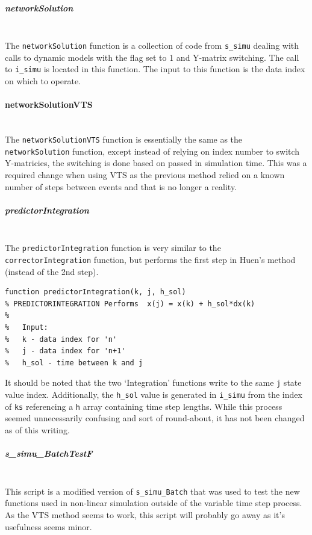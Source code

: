 \documentclass[12pt]{article}
\begin{document}
\subparagraph{networkSolution} \ \\
The \verb|networkSolution| function is a collection of code from \verb|s_simu| dealing with calls to dynamic models with the flag set to 1 and Y-matrix switching.
The call to \verb|i_simu| is located in this function.
The input to this function is the data index on which to operate.

\paragraph{networkSolutionVTS} \ \\
The \verb|networkSolutionVTS| function is essentially the same as the \verb|networkSolution| function, except instead of relying on index number to switch Y-matricies, the switching is done based on passed in simulation time.
This was a required change when using VTS as the previous method relied on a known number of steps between events and that is no longer a reality.

\subparagraph{predictorIntegration} \ \\
The \verb|predictorIntegration| function is very similar to the \verb|correctorIntegration| function, but performs the first step in Huen's method (instead of the 2nd step).
\begin{verbatim}
function predictorIntegration(k, j, h_sol)
% PREDICTORINTEGRATION Performs  x(j) = x(k) + h_sol*dx(k)
%
%   Input:
%   k - data index for 'n'
%   j - data index for 'n+1'
%   h_sol - time between k and j
\end{verbatim}

It should be noted that the two `Integration' functions write to the same \verb|j| state value index.
Additionally, the \verb|h_sol| value is generated in \verb|i_simu| from the index of \verb|ks| referencing a \verb|h| array containing time step lengths.
While this process seemed unnecessarily confusing and sort of  round-about, it has not been changed as of this writing.

\subparagraph{s\_simu\_BatchTestF} \ \\
This script is a modified version of \verb|s_simu_Batch| that was used to test the new functions used in non-linear simulation outside of the variable time step process.
As the VTS method seems to work, this script will probably go away as it's usefulness seems minor.
\end{document}
